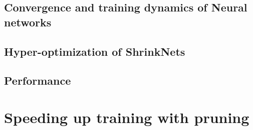 \subsection{Convergence and training dynamics of Neural networks}

\subsection{Hyper-optimization of ShrinkNets}

\subsection{Performance}

\section{Speeding up training with pruning}